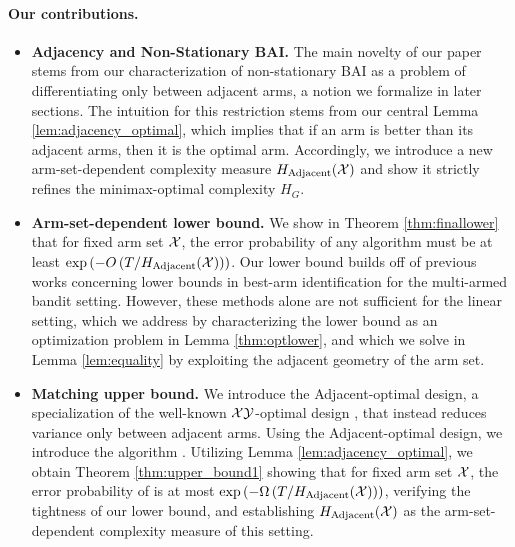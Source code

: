 \paragraph{Our contributions.}
\begin{itemize}
    \item \textbf{Adjacency and Non-Stationary BAI.} The main novelty of our paper stems from our characterization of non-stationary BAI as a problem of differentiating only between adjacent arms, a notion we formalize in later sections. The intuition for this restriction stems from our central Lemma \ref{lem:adjacency_optimal}, which implies that if an arm is better than its adjacent arms, then it is the optimal arm. Accordingly, we introduce a new arm-set-dependent complexity measure $ H_{\mathrm{Adjacent}}(\mathcal{X})$ and show it strictly refines the minimax-optimal complexity $ H_G$. 
    \item \textbf{Arm-set-dependent lower bound.} We show in Theorem \ref{thm:finallower} that for fixed arm set $\mathcal{X}$, the error probability of any algorithm must be at least $\exp\left(-O\left(T/H_{\mathrm{Adjacent}}(\mathcal{X})\right)\right)$. Our lower bound builds off of previous works \citep{kaufmann2016complexity, abbasi2018best} concerning lower bounds in best-arm identification for the multi-armed bandit setting. However, these methods alone are not sufficient for the linear setting, which we address by characterizing the lower bound as an optimization problem in Lemma \ref{thm:optlower}, and which we solve in Lemma \ref{lem:equality} by exploiting the adjacent geometry of the arm set.
    \item \textbf{Matching upper bound.} We introduce the Adjacent-optimal design, a specialization of the well-known $\mathcal{X}\mathcal{Y}$-optimal design \citep{soare2014best}, that instead reduces variance only between adjacent arms. Using the Adjacent-optimal design, we introduce the algorithm \algoname. Utilizing Lemma \ref{lem:adjacency_optimal}, we obtain Theorem \ref{thm:upper_bound1} showing that for fixed arm set $\mathcal{X}$, the error probability of \algoname is at most $\exp\left(-\Omega\left(T/H_{\mathrm{Adjacent}}(\mathcal{X})\right)\right)$, verifying the tightness of our lower bound, and establishing $ H_{\mathrm{Adjacent}}(\mathcal{X})$ as 
    the arm-set-dependent complexity measure of this setting.
\end{itemize}

